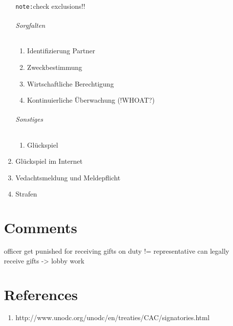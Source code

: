 \documentclass{article}
\begin{document}
\begin{enumerate}
			\texttt{note:}check exclusions!!
		
		\paragraph{Sorgfalten}
		\begin{enumerate}
			\item Identifizierung Partner
			\item Zweckbestimmung
			\item Wirtschaftliche Berechtigung
			\item Kontinuierliche Überwachung (!WHOAT?)
		\end{enumerate}

		\paragraph{Sonstiges}
		\begin{enumerate}
			\item Glückspiel
		\end{enumerate}
	\item Glückspiel im Internet
	\item Vedachtsmeldung und Meldepflicht
	\item Strafen
\end{enumerate}


\part[Comments]{Comments}
officer get punished for receiving gifts on duty != representative can legally receive gifts -> lobby work

\part[Links]{References}
\begin{enumerate}
	\item http://www.unodc.org/unodc/en/treaties/CAC/signatories.html
\end{enumerate}
\end{document}

